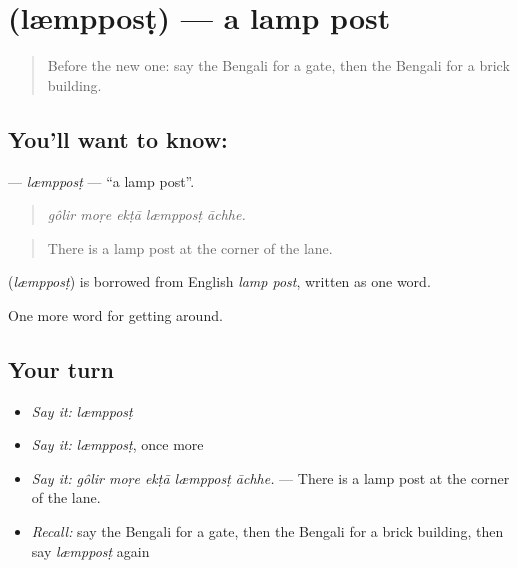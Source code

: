 \section[\texorpdfstring{\bn{ল্যাম্পপোস্ট} (læmpposṭ)}{ল্যাম্পপোস্ট (læmpposṭ)}]{ (læmpposṭ) — a lamp post}

\label{lesson:BN-C412-lemppost}



\begin{quote}
Before the new one: say the Bengali for a gate, then the Bengali for a brick building.
\end{quote}

\subsection*{You'll want to know: }
\textbf{} — \emph{læmpposṭ} — \textquotedblleft{}a lamp post\textquotedblright{}.

\begin{quote}
    
\end{quote}

\begin{quote}
\emph{gôlir moṛe ekṭā læmpposṭ āchhe.}
\end{quote}

\begin{quote}
There is a lamp post at the corner of the lane.
\end{quote}

\begin{cousinweb}
\textbf{} (\emph{læmpposṭ}) is borrowed from English \emph{lamp post}, written as one word.
\end{cousinweb}

\begin{grammarlens}[title={What you've built}]
One more word for getting around.
\end{grammarlens}

\subsection*{Your turn}
\begin{itemize}
\raggedright
  \item \emph{Say it:} \emph{læmpposṭ}
  \item \emph{Say it:} \emph{læmpposṭ}, once more
  \item \emph{Say it:} \emph{gôlir moṛe ekṭā læmpposṭ āchhe.} — There is a lamp post at the corner of the lane.
  \item \emph{Recall:} say the Bengali for a gate, then the Bengali for a brick building, then say \emph{læmpposṭ} again
\end{itemize}

